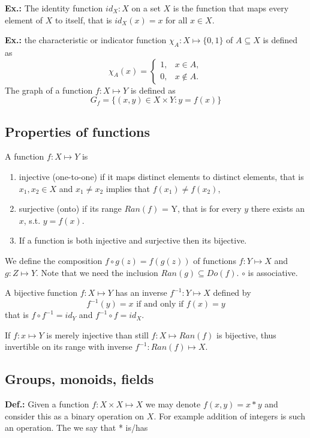 \documentclass{article}
\begin{document}
\textbf{Ex.:} The identity function $id_X:X$ on a set $X$ is the function that maps every element of $X$ to itself, that is $id_X(x) = x$ for all $x\in X$.

\textbf{Ex.:} the characteristic or indicator function $\chi_A:X\mapsto \{0, 1\}$ of $A\subseteq X$ is defined as 
\[
\chi_{A}(x) =
\begin{cases}
1, & x \in A,\\
0, & x \notin A.
\end{cases}
\]
The graph of a function $f: X\mapsto Y$ is defined as
\[
G_f= \{(x, y)\in X\times Y:y = f(x)\}
\]

\subsection{Properties of functions}

A function $f: X\mapsto Y$ is
\begin{enumerate}
    \item injective (one-to-one) if it maps distinct elements to distinct elements, that is $x_1, x_2\in X$ and $x_1\neq x_2$ implies that $f(x_1)\neq f(x_2)$,
    \item surjective (onto) if its range $Ran(f)$ = Y, that is for every $y$ there exists an $x$, s.t. $y=f(x)$.
    \item If a function is both injective and surjective then its bijective.
\end{enumerate}

We define the composition $f\circ g(z) = f(g(z))$ of functions $f: Y\mapsto X$ and $g: Z\mapsto Y$. Note that we need the inclusion $Ran(g)\subseteq Do(f)$. $\circ$ is associative.

A bijective function $f: X\mapsto Y$ has an inverse $f^{-1}: Y\mapsto X$ defined by
\[
f^{-1}(y) = x \text{ if and only if } f(x) = y
\]
   that is $f\circ f^{-1} = id_Y$ and $f^{-1}\circ f = id_X$.
   
If $f: x\mapsto Y$ is merely injective than still $f: X\mapsto Ran(f)$ is bijective, thus invertible on its range with inverse $f^{-1}: Ran(f)\mapsto X$.

\subsection{Groups, monoids, fields}

\textbf{Def.:} Given a function $f: X\times X \mapsto X$ we may denote $f(x, y) = x * y$ and consider this as a binary operation on $X$. For example addition of integers is such an operation. The we say that * is/has
\end{document}
